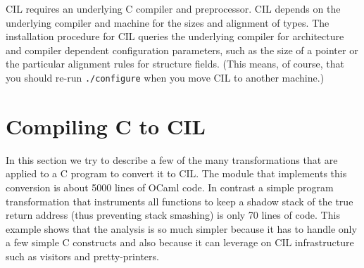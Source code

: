 \documentclass[letterpaper]{article}
\def\t#1{{\tt #1}}
\begin{document}
 CIL requires an underlying C compiler and preprocessor. CIL depends on the
underlying compiler and machine for the sizes and alignment of types. The
installation procedure for CIL queries the underlying compiler for
architecture and compiler dependent configuration parameters, such as the size
of a pointer or the particular alignment rules for structure fields. (This
means, of course, that you should re-run \t{./configure} when you move CIL to
another machine.)

\section{Compiling C to CIL}\label{sec-cabs2cil}

 In this section we try to describe a few of the many transformations that are
applied to a C program to convert it to CIL. The module that implements this
conversion is about 5000 lines of OCaml code. In contrast a simple program
transformation that instruments all functions to keep a shadow stack of the
true return address (thus preventing stack smashing) is only 70 lines of code.
This example shows that the analysis is so much simpler because it has to
handle only a few simple C constructs and also because it can leverage on CIL
infrastructure such as visitors and pretty-printers.
\end{document}
